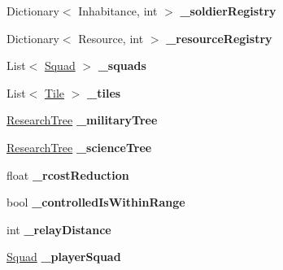 \begin{DoxyCompactItemize}
\item 
\hypertarget{class_player_a3b866c79c3c8b01e75f24088477e6c16}{}Dictionary$<$ Inhabitance, int $>$ {\bfseries \+\_\+soldier\+Registry}\label{class_player_a3b866c79c3c8b01e75f24088477e6c16}

\item 
\hypertarget{class_player_a79ea04b40862fca437479425901520cd}{}Dictionary$<$ Resource, int $>$ {\bfseries \+\_\+resource\+Registry}\label{class_player_a79ea04b40862fca437479425901520cd}

\item 
\hypertarget{class_player_afe2729abe46f9ee44f834323397f0a27}{}List$<$ \hyperlink{class_squad}{Squad} $>$ {\bfseries \+\_\+squads}\label{class_player_afe2729abe46f9ee44f834323397f0a27}

\item 
\hypertarget{class_player_a6c0fee6ce65539afa78f37fb7a36f3c2}{}List$<$ \hyperlink{class_tile}{Tile} $>$ {\bfseries \+\_\+tiles}\label{class_player_a6c0fee6ce65539afa78f37fb7a36f3c2}

\item 
\hypertarget{class_player_a68e258b5b4ad9e280c1f372524f14f85}{}\hyperlink{class_research_tree}{Research\+Tree} {\bfseries \+\_\+military\+Tree}\label{class_player_a68e258b5b4ad9e280c1f372524f14f85}

\item 
\hypertarget{class_player_a411ecb6b4cac8ff38b874b10ac720dbe}{}\hyperlink{class_research_tree}{Research\+Tree} {\bfseries \+\_\+science\+Tree}\label{class_player_a411ecb6b4cac8ff38b874b10ac720dbe}

\item 
\hypertarget{class_player_a9d2cb58f08e70405f6e97595f4fb0336}{}float {\bfseries \+\_\+rcost\+Reduction}\label{class_player_a9d2cb58f08e70405f6e97595f4fb0336}

\item 
\hypertarget{class_player_add0623a379a030346d0e02bf16dd7540}{}bool {\bfseries \+\_\+controlled\+Is\+Within\+Range}\label{class_player_add0623a379a030346d0e02bf16dd7540}

\item 
\hypertarget{class_player_a101167b6c4fdc4b957a27c9fbeb52147}{}int {\bfseries \+\_\+relay\+Distance}\label{class_player_a101167b6c4fdc4b957a27c9fbeb52147}

\item 
\hypertarget{class_player_aaf9015fbf64595ae3b5c38127f3971b0}{}\hyperlink{class_squad}{Squad} {\bfseries \+\_\+player\+Squad}\label{class_player_aaf9015fbf64595ae3b5c38127f3971b0}


\end{DoxyCompactItemize}
